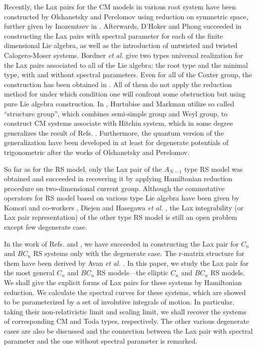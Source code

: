 \documentclass[a4paper,12pt]{article}
\begin{document}
Recently, the Lax pairs for the CM models in various root system have
been constructed by Olshanetsky and Perelomov\cite{op} using
reduction on symmetric space, further given by Inozemtsev in
\cite{in}. Afterwards, D'Hoker and Phong\cite{hp1} succeeded in	 constructing
the Lax pairs with spectral parameter for each of the finite
dimensional Lie algebra,  as well as the introduction of
untwisted and twisted Calogero-Moser systems. Bordner
\textit{et al.}\cite{bcs,bcs2,bcs3} give two types
universal realization  for the Lax pairs associated
to all of the Lie algebra: the root type and the minimal
type, with and without spectral parameters.
Even for  all of the Coxter group, the construction has been
obtained in \cite{bcs1}.  All of them do not apply the reduction method
for under which condition one will confront some obstruction\cite{hm}
but using pure Lie algebra construction. In \cite {hm},
Hurtubise and Markman utilize so called ``structure group'',
which combines semi-simple group and Weyl group, to
construct CM systems associate with Hitchin system, which in
some degree generalizes the result of Refs.
\cite{hp1,bcs,bcs2,bcs3,bcs1}. Furthermore, the quantum
version of the generalization have been developed in
\cite{bms,kps} at least	 for degenerate potentials of
trigonometric after  the works of Olshanetsky and Perelomov\cite{op1}.

So far as for the RS model, only the Lax
pair of the $A_{N-1}$ type RS model was obtained \cite{r1,nksr,bc,kz,s1,s2} and
succeeded in recovering it  by applying
Hamiltonian reduction procedure on two-dimensional current
group\cite{aru}. Although the
commutative operators for RS model based on various type Lie
algebra have been given by Komori and co-workers
\cite{ko1,ko2}, Diejen\cite{di,di1} and Hasegawa \textit{et
al.} \cite{h1,h2}, the Lax integrability (or Lax pair representation)
of the other type RS model is still an open problem\cite{bm1}
except few  degenerate case\cite{kai3,Che00}.


In the work of Refs. \cite{kai3} and \cite{Che00}, we have
succeeded in constructing the Lax pair for $C_{n}$ and $BC_{n}$ RS systems
only with the degenerate case. The r-matrix structure for them have been
derived by Avan \textit{et al.} \cite{Avan}. In this paper, we study
the Lax pair for the most general  $C_{n}$ and $BC_{n}$ RS models---the
elliptic  $C_{n}$ and $BC_{n}$ RS models.
We shall give the explicit forms of Lax pairs
for these systems by Hamiltonian reduction. We calculate the
spectral curves for these systems, which are showed to be
parameterized by a set of involutive integrals of motion. In
particular, taking their non-relativistic limit and scaling
limit, we shall recover the systems of corresponding CM and
Toda types, respectively. The other various
degenerate cases are also be discussed and the connection
between the Lax pair with spectral parameter and the one
without spectral parameter is remarked.
\end{document}

